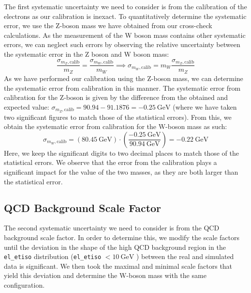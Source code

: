\documentclass[a4paper]{report}
\numberwithin{equation}{section}
\begin{document}
The first systematic uncertainty we need to consider is from the calibration of the electrons as our calibration is inexact. 
To quantitatively determine the systematic error, we use the Z-boson mass we have obtained from our cross-check calculations.
As the measurement of the W boson mass contains other systematic errors, we can neglect such errors by observing the 
relative uncertainty between the systematic error in the Z boson and W boson mass:
\begin{equation}
    \frac{\sigma_{m_Z, \mathrm{calib}}}{m_Z} = \frac{\sigma_{m_W, \mathrm{calib}}}{m_W} \implies \sigma_{m_W, \mathrm{calib}} = m_W \frac{\sigma_{m_Z, \mathrm{calib}}}{m_Z}
\end{equation} 
As we have performed our calibration using the Z-boson mass, we can determine the systematic error from calibration in this manner. 
The systematic error from calibration for the Z-boson is given by the difference from the obtained and 
expected value: $\sigma_{m_Z, \mathrm{calib}} = 90.94 - 91.1876 = -\SI{0.25}{\giga\electronvolt}$ (where we have taken two 
significant figures to match those of the statistical errors). From this, we obtain the 
systematic error from calibration for the W-boson mass as such: 
\begin{equation}
    \sigma_{m_W, \mathrm{calib}} = (\SI{80.45}{\giga\electronvolt}) \cdot \left( \frac{\SI{-0.25}{\giga\electronvolt}}{\SI{90.94}{\giga\electronvolt}}\right) = -\SI{0.22}{\giga\electronvolt}
\end{equation}
Here, we keep the significant digits to two decimal places to match those of the statistical errors. We observe that the 
error from the calibration plays a significant impact for the value of the two masses, as they are both larger than the 
statistical error. 

\subsection{QCD Background Scale Factor}

The second systematic uncertainty we need to consider is from the QCD background scale factor. In order to determine this, we modify 
the scale factors until the deviation in the shape of the high QCD background region in the \texttt{el\_etiso} distribution 
(\texttt{el\_etiso} $< \SI{10}{\giga\electronvolt}$ ) between the real and simulated data is significant. We then took the 
maximal and minimal scale factors that yield this deviation and determine the W-boson mass with the same configuration. \par 
\end{document}

